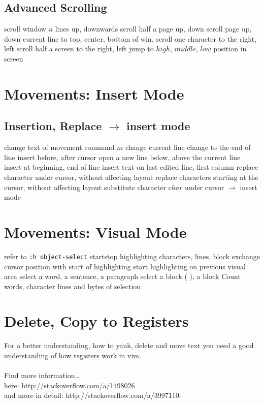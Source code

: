 \subsection{Advanced Scrolling}	{}
	{scroll window $n$ lines up, downwards}
	{scroll half a page up, down}
	{scroll page up, down}
	{current line to top, center, bottom of win.}
	{scroll one character to the right, left}
	{scroll half a screen to the right, left}
	{jump to $high$, $middle$, $low$ position in screen}

\section{Movements: Insert Mode}	{}
\subsection{Insertion, Replace $\to$ insert mode}	{}
	{change text of movement command $m$}
	{change current line}
	{change to the end of line}
	{insert before, after cursor}
	{open a new line below, above the current line}
	{insert at beginning, end of line}
	{insert text on last edited line, first column}
	{replace character under cursor, without affecting layout}
	{replace characters starting at the cursor, without affecting layout}
	{substitute character $char$ under cursor $\to$ insert mode}

\section{Movements: Visual Mode}	{refer to {\tt :h object-select}}
	{start\or stop highlighting characters, lines, block}
	{exchange cursor position with start of highlighting}
	{start highlighting on previous visual area}
	{select a word, a sentence, a paragraph}
	{select a block ( ), a block {\tt\lapos}	{\tt\rapos}}
	{Count words, character lines and bytes of selection}

\vfil\break

\section{Delete, Copy to Registers}	{For a better understanding, how to yank,
delete and move text you need a good understanding of how registers work in
vim.\\\\Find more information\ldots \\ here: http://stackoverflow.com/a/1498026\\ and more
in detail: http://stackoverflow.com/a/3997110.}
